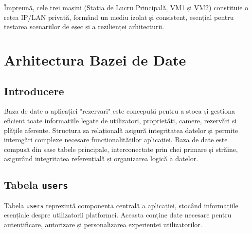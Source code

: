 \documentclass[12pt, a4paper, oneside, romanian]{teza-upb}
\begin{document}
Împreună, cele trei mașini (Stația de Lucru Principală, VM1 și VM2) constituie o rețea IP/LAN privată, formând un mediu izolat și consistent, esențial pentru testarea scenariilor de eșec și a rezilienței arhitecturii.


\section{Arhitectura Bazei de Date}

\subsection*{Introducere}
Baza de date a aplicației "rezervari" este concepută pentru a stoca și gestiona eficient toate informațiile legate de utilizatori, proprietăți, camere, rezervări și plățile aferente. Structura sa relațională asigură integritatea datelor și permite interogări complexe necesare funcționalităților aplicației. Baza de date este compusă din șase tabele principale, interconectate prin chei primare și străine, asigurând integritatea referențială și organizarea logică a datelor.



\subsection{Tabela \texttt{users}}

	 Tabela \texttt{users} reprezintă componenta centrală a aplicației, stocând informațiile esențiale despre utilizatorii platformei. Aceasta conține date necesare pentru autentificare, autorizare și personalizarea experienței utilizatorilor.
	 
\end{document}
